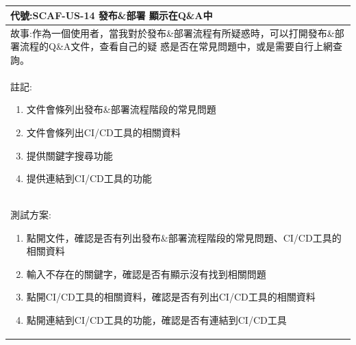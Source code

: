 \documentclass{report}
\begin{document}
\subsection*{}
\fontsize{12}{20}\selectfont
\begin{tabularx}{\textwidth}{|X|}
  \hline
  代號:SCAF-US-14 發布\&部署 顯示在Q\&A中 \\
  \hline
  故事:作為一個使用者，當我對於發布\&部署流程有所疑惑時，可以打開發布\&部署流程的Q\&A文件，查看自己的疑
  惑是否在常見問題中，或是需要自行上網查詢。 \\
  \hline
  註記:
  \begin{enumerate}
    \item 文件會條列出發布\&部署流程階段的常見問題
    \item 文件會條列出CI/CD工具的相關資料
    \item 提供關鍵字搜尋功能
    \item 提供連結到CI/CD工具的功能
  \end{enumerate} \\
  \hline
  測試方案:
  \begin{enumerate}
    \item 點開文件，確認是否有列出發布\&部署流程階段的常見問題、CI/CD工具的相關資料
    \item 輸入不存在的關鍵字，確認是否有顯示沒有找到相關問題
    \item 點開CI/CD工具的相關資料，確認是否有列出CI/CD工具的相關資料
    \item 點開連結到CI/CD工具的功能，確認是否有連結到CI/CD工具
  \end{enumerate} \\
  \hline
\end{tabularx}
\end{document}
